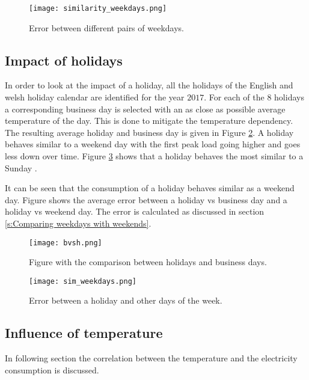 \begin{figure}[h!]
	\centering
	\texttt{[image: similarity\_weekdays.png]}
	\caption{Error between different pairs of weekdays.}
	\label{fig:similarity_weekdays}
\end{figure}




\subsection{Impact of holidays}
In order to look at the impact of a holiday, all the holidays of the English and welsh holiday calendar are identified for the year $ 2017 $. For each of the $ 8 $ holidays a corresponding business day is selected with an as close as possible average temperature of the day. This is done to mitigate the temperature dependency. The resulting average holiday and business day is given in Figure \ref{fig:bvsh}. A holiday behaves similar to a weekend day with the first peak load going higher and goes less down over time. Figure \ref{fig:sim_weekdays} shows that a holiday behaves the most similar to a Sunday .

It can be seen that the consumption of a holiday behaves similar as a weekend day. Figure shows the average error between a holiday vs business day and a holiday vs weekend day. The error is calculated as discussed in section \ref{s:Comparing weekdays with weekends}. 

\begin{figure}[h!]
	\centering
	\texttt{[image: bvsh.png]}
	\caption{Figure with the comparison between holidays and business days.}
	\label{fig:bvsh}
\end{figure}

\begin{figure}[h!]
	\centering
	\texttt{[image: sim\_weekdays.png]}
	\caption{Error between a holiday and other days of the week.}
	\label{fig:sim_weekdays}
\end{figure}


\subsection{Influence of temperature}
In following section the correlation between the temperature and the electricity consumption is discussed.\\


